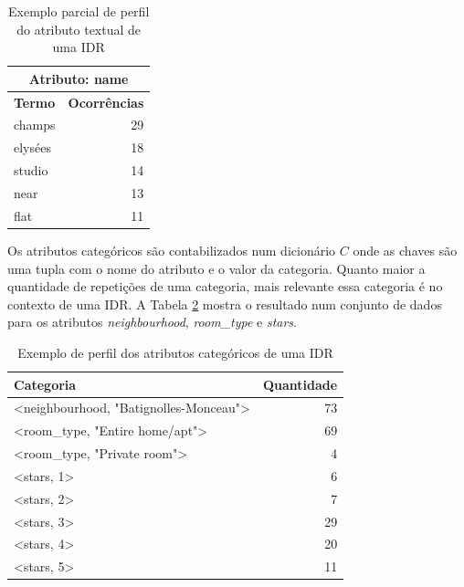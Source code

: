 \begin{table}[!h]
	\centering
	\begin{tabular}{|l|r|}
	\hline
	\multicolumn{2}{|c|}{\textbf{Atributo: name}} \\ \hline
	\textbf{Termo}     & \textbf{Ocorrências}     \\ \hline
	champs             & 29                       \\ \hline
	elysées            & 18                       \\ \hline
	studio             & 14                       \\ \hline
	near               & 13                       \\ \hline
	flat               & 11                       \\ \hline
	\end{tabular}
	\caption{Exemplo parcial de perfil do atributo textual de uma IDR}
	\label{table:perfil-textual}
\end{table}

Os atributos categóricos são contabilizados num dicionário $C$ onde as chaves são uma tupla com o nome do atributo e o valor da categoria. Quanto maior a quantidade de repetições de uma categoria, mais relevante essa categoria é no contexto de uma IDR. A Tabela \ref{table:perfil-categoricos} mostra o resultado num conjunto de dados para os atributos {\em neighbourhood}, {\em room\_type} e {\em stars}.

\begin{table}[!h]
	\centering
	\begin{tabular}{|l|r|}
	\hline
	\textbf{Categoria}                                            & \textbf{Quantidade} \\ \hline
	\textless{}neighbourhood, "Batignolles-Monceau"\textgreater{} & 73                  \\ \hline
	\textless{}room\_type, "Entire home/apt"\textgreater{}        & 69                  \\ \hline
	\textless{}room\_type, "Private room"\textgreater{}           & 4                   \\ \hline
	\textless{}stars, 1\textgreater{}                             & 6                   \\ \hline
	\textless{}stars, 2\textgreater{}                             & 7                   \\ \hline
	\textless{}stars, 3\textgreater{}                             & 29                  \\ \hline
	\textless{}stars, 4\textgreater{}                             & 20                  \\ \hline
	\textless{}stars, 5\textgreater{}                             & 11                  \\ \hline
	\end{tabular}
	\caption{Exemplo de perfil dos atributos categóricos de uma IDR}
	\label{table:perfil-categoricos}
\end{table}

